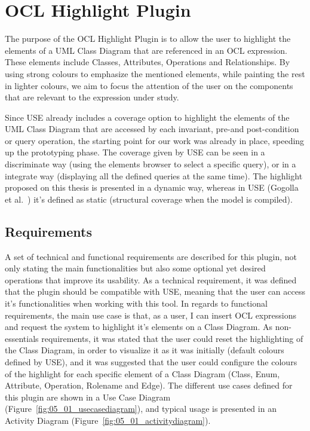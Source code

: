 \section{OCL Highlight Plugin}
\label{chap:Implementation-OCLHighlightPlugin}

The purpose of the OCL Highlight Plugin is to allow the user to highlight the elements of a UML Class Diagram that are referenced in an OCL expression. These elements include Classes, Attributes, Operations and Relationships. By using strong colours to emphasize the mentioned elements, while painting the rest in lighter colours, we aim to focus the attention of the user on the components that are relevant to the expression under study.

Since USE already includes a coverage option to highlight the elements of the UML Class Diagram that are accessed by each invariant, pre-and post-condition or query operation, the starting point for our work was already in place, speeding up the prototyping phase. The coverage given by USE can be seen in a discriminate way (using the elements browser to select a specific query), or in a integrate way (displaying all the defined queries at the same time). The highlight proposed on this thesis is presented in a dynamic way, whereas in USE  (Gogolla et al.~\cite{GogollaHH14, GogollaHHS15}) it's defined as static (structural coverage when the model is compiled).

\subsection{Requirements}

A set of technical and functional requirements are described for this plugin, not only stating the main functionalities but also some optional yet desired operations that improve its usability. As a technical requirement, it was defined that the plugin should be compatible with USE, meaning that the user can access it's functionalities when working with this tool. In regards to functional requirements, the main use case is that, as a user, I can insert OCL expressions and request the system to highlight it's elements on a Class Diagram. As non-essentials requirements, it was stated that the user could reset the highlighting of the Class Diagram, in order to visualize it as it was initially (default colours defined by USE), and it was suggested that the user could configure the colours of the highlight for each specific element of a Class Diagram (Class, Enum, Attribute, Operation, Rolename and Edge). 
The different use cases defined for this plugin are shown in a Use Case Diagram (Figure~\ref{fig:05_01_usecasediagram}), and typical usage is presented in an Activity Diagram (Figure~\ref{fig:05_01_activitydiagram}).

